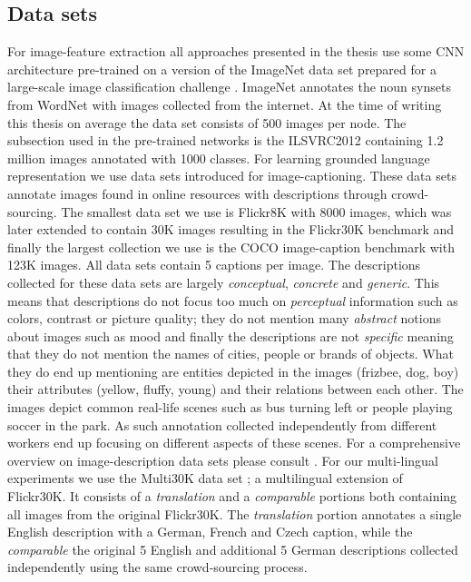 \subsection{Data sets}
For image-feature extraction all approaches presented in the thesis use some 
CNN architecture pre-trained on a version of the ImageNet data set \cite{deng2009imagenet} prepared for a large-scale image classification challenge \cite{russakovsky2015imagenet}. ImageNet annotates the noun synsets from WordNet \cite{miller1995wordnet} with images collected from the internet. At the time of writing this thesis on average the data set consists of 500 images per node. The subsection used in the pre-trained networks is the ILSVRC2012 containing 1.2 million images annotated with 1000 classes. For learning grounded language representation we use data sets introduced for image-captioning. These data sets annotate images found in online resources with descriptions through crowd-sourcing. The smallest data set we use is Flickr8K \cite{hodosh2013framing} with 8000 images, which was later extended to contain 30K images resulting in the Flickr30K benchmark \cite{young2014image} and finally the largest collection we use is the COCO image-caption benchmark \cite{chen2015microsoft} with 123K images. All data sets contain 5 captions per image. 
The descriptions collected for these data sets are largely \emph{conceptual}, \emph{concrete} and \emph{generic}. This means that descriptions do not focus too much on \emph{perceptual} information such as colors, contrast or picture quality; they do not mention many \emph{abstract} notions about images such as mood and finally the descriptions are not \emph{specific} meaning that they do not mention the names of cities, people or brands of objects. What they do end up mentioning are entities depicted in the images (frizbee, dog, boy) their attributes (yellow, fluffy, young) and their relations between each other. The images depict common real-life scenes such as bus turning left or people playing soccer in the park. As such annotation collected independently from different workers end up focusing on different aspects of these scenes. For a comprehensive overview on image-description data sets please consult \cite{bernardi2016automatic}. 
For our multi-lingual experiments we use the Multi30K data set \cite{elliott2016multi30k,elliott2017findings}; a multilingual extension of Flickr30K. It consists of a {\it translation} and a {\it comparable} portions both containing all images from the original Flickr30K. The \emph{translation} portion annotates a single English description with a German, French and Czech caption, while the \emph{comparable} the original 5 English and additional 5 German descriptions collected independently using the same crowd-sourcing process.  


